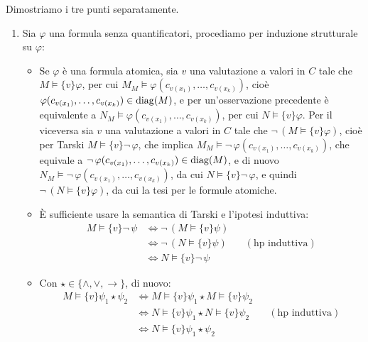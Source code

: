 \begin{soln}
    Dimostriamo i tre punti separatamente.
    \begin{enumerate}
        \item Sia $\varphi$ una formula senza quantificatori, procediamo per induzione strutturale su $\varphi$:
        \begin{itemize}
            \item[$\boxed{\text{$\varphi$ atomica}}$] Se $\varphi$ è una formula atomica, sia $v$ una valutazione a valori in $C$ tale che $M \models \{v\} \varphi$, per cui $M_M \models \varphi(c_{v(x_1)},\ldots,c_{v(x_k)})$, cioè $\varphi(c_{v(x_1)},\ldots,c_{v(x_k)}) \in \operatorname{diag}(M)$, e per un'osservazione precedente è equivalente a $N_M \models \varphi(c_{v(x_1)},\ldots,c_{v(x_k)})$, per cui $N \models \{v\} \varphi$.
            Per il viceversa sia $v$ una valutazione a valori in $C$ tale che $\neg\,(M \models \{v\} \varphi)$, cioè per Tarski $M \models \{v\} \neg\, \varphi$, che implica $M_M \models \neg\, \varphi(c_{v(x_1)},\ldots,c_{v(x_k)})$, che equivale a $\neg\, \varphi(c_{v(x_1)},\ldots,c_{v(x_k)}) \in \operatorname{diag}(M)$, e di nuovo $N_M \models \neg\, \varphi(c_{v(x_1)},\ldots,c_{v(x_k)})$, da cui $N \models \{v\} \neg\, \varphi$,
            e quindi $\neg\,(N \models \{v\} \varphi)$, da cui la tesi per le formule atomiche.
            \item[$\boxed{\text{$\varphi = \neg\, \psi$}}$] È sufficiente usare la semantica di Tarski e l'ipotesi induttiva:
            \begin{align*}
                M \models \{v\} \neg\, \psi &\iff \neg\,(M \models \{v\} \psi) \\
                                             &\iff \neg\,(N \models \{v\} \psi) &&(\text{hp induttiva}) \\
                                             &\iff N \models \{v\} \neg\, \psi
            \end{align*}       
            \item[$\boxed{\text{$\varphi = \psi_1 \star \psi_2$}}$] Con $\star \in \{\land, \lor, \to\}$, di nuovo:
            \begin{align*}
                M \models \{v\} \psi_1 \star \psi_2 &\iff M \models \{v\} \psi_1 \star M \models \{v\} \psi_2 \\
                                                    &\iff N \models \{v\} \psi_1 \star N \models \{v\} \psi_2 &&(\text{hp induttiva}) \\
                                                    &\iff N \models \{v\} \psi_1 \star \psi_2

\end{align*}
\end{itemize}
\end{enumerate}
\end{soln}

